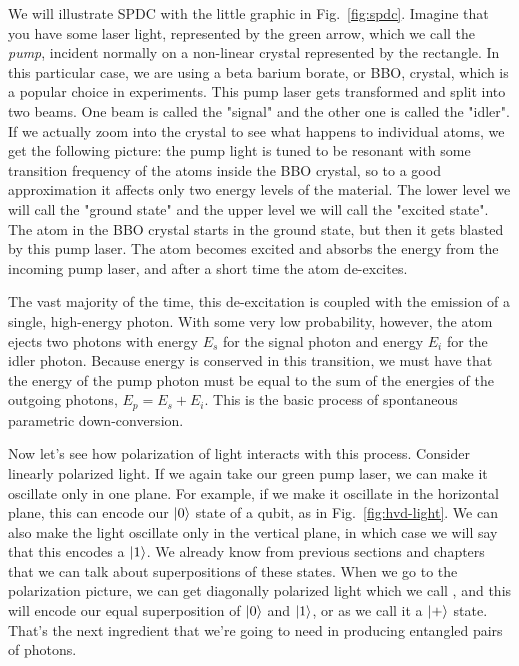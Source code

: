We will illustrate SPDC with the little graphic in Fig.~\ref{fig:spdc}. Imagine that you have some laser light, represented by the green arrow, which we call the \emph{pump}, incident normally on a non-linear crystal represented by the rectangle. In this particular case, we are using a beta barium borate, or BBO, crystal, which is a popular choice in experiments. This pump laser gets transformed and split into two beams. One beam is called the "signal" and the other one is called the "idler". If we actually zoom into the crystal to see what happens to individual atoms, we get the following picture: the pump light is tuned to be resonant with some transition frequency of the atoms inside the BBO crystal, so to a good approximation it affects only two energy levels of the material. The lower level we will call the "ground state" and the upper level we will call the "excited state". The atom in the BBO crystal starts in the ground state, but then it gets blasted by this pump laser.  The atom becomes excited and absorbs the energy from the incoming pump laser, and after a short time the atom de-excites.

The vast majority of the time, this de-excitation is coupled with the emission of a single, high-energy photon. With some very low probability, however, the atom ejects two photons with energy $E_s$ for the signal photon and energy $E_i$ for the idler photon. Because energy is conserved in this transition, we must have that the energy of the pump photon must be equal to the sum of the energies of the outgoing photons, $E_p = E_s + E_i$. This is the basic process of spontaneous parametric down-conversion.

Now let's see how polarization of light interacts with this process. Consider linearly polarized light. If we again take our green pump laser, we can make it oscillate only in one plane. For example, if we make it oscillate in the horizontal plane, this can encode our $\left| 0 \right\rangle$ state of a qubit, as in Fig.~\ref{fig:hvd-light}. We can also make the light oscillate only in the vertical plane, in which case we will say that this encodes a $\left| 1 \right\rangle$. We already know from previous sections and chapters that we can talk about superpositions of these states. When we go to the polarization picture, we can get diagonally polarized light which we call , and this will encode our equal superposition of $\left| 0 \right\rangle$ and $\left| 1 \right\rangle$, or as we call it a $\left| + \right\rangle$ state. That's the next ingredient that we're going to need in producing entangled pairs of photons.

